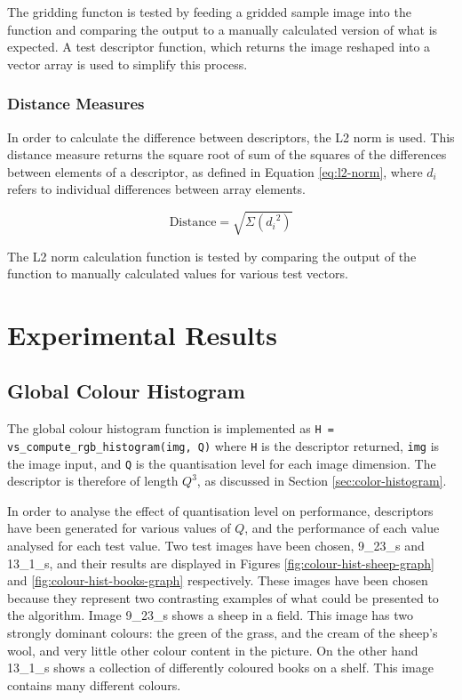 The gridding functon is tested by feeding a gridded sample image into the function and comparing the output to a manually calculated version of what is expected. A test descriptor function, which returns the image reshaped into a vector array is used to simplify this process.

\subsection{Distance Measures} \label{sec:distance-measures}

In order to calculate the difference between descriptors, the L2 norm is used. This distance measure returns the square root of sum of the squares of the differences between elements of a descriptor, as defined in Equation \ref{eq:l2-norm}, where $d_i$ refers to individual differences between array elements.

\begin{equation}
	\text{Distance} = \sqrt{ \Sigma{ ({d_i}^2)} }
	\label{eq:l2-norm}
\end{equation}

The L2 norm calculation function is tested by comparing the output of the function to manually calculated values for various test vectors.

\chapter{Experimental Results} \label{sec:results}

\section{Global Colour Histogram} \label{sec:global-colour-histogram-results}
The global colour histogram function is implemented as \texttt{H =  vs\_compute\_rgb\_histogram(img, Q)} where \texttt{H} is the descriptor returned, \texttt{img} is the image input, and \texttt{Q} is the quantisation level for each image dimension. The descriptor is therefore of length $Q^3$, as discussed in Section \ref{sec:color-histogram}.

In order to analyse the effect of quantisation level on performance, descriptors have been generated for various values of $Q$, and the performance of each value analysed for each test value. Two test images have been chosen, 9\_23\_s and 13\_1\_s, and their results are displayed in Figures \ref{fig:colour-hist-sheep-graph} and \ref{fig:colour-hist-books-graph} respectively. These images have been chosen because they represent two contrasting examples of what could be presented to the algorithm. Image 9\_23\_s shows a sheep in a field. This image has two strongly dominant colours: the green of the grass, and the cream of the sheep's wool, and very little other colour content in the picture. On the other hand 13\_1\_s shows a collection of differently coloured books on a shelf. This image contains many different colours.

